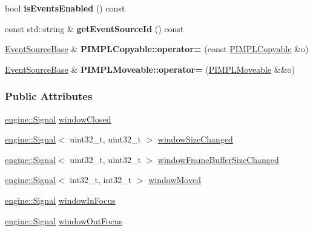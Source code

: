 \begin{DoxyCompactItemize}
\item 
bool {\bfseries is\+Events\+Enabled} () const \hypertarget{a00036_a659325f18d666f132f380e4319499572}{}\label{a00036_a659325f18d666f132f380e4319499572}

\item 
const std\+::string \& {\bfseries get\+Event\+Source\+Id} () const \hypertarget{a00036_ad41deeb2b9de38797b10777e5d1ecf13}{}\label{a00036_ad41deeb2b9de38797b10777e5d1ecf13}

\item 
\hyperlink{a00036}{Event\+Source\+Base} \& {\bfseries P\+I\+M\+P\+L\+Copyable\+::operator=} (const \hyperlink{a00060}{P\+I\+M\+P\+L\+Copyable} \&o)\hypertarget{a00060_a26fdb9b3d449d04dc653c7ae942f452b}{}\label{a00060_a26fdb9b3d449d04dc653c7ae942f452b}

\item 
\hyperlink{a00036}{Event\+Source\+Base} \& {\bfseries P\+I\+M\+P\+L\+Moveable\+::operator=} (\hyperlink{a00061}{P\+I\+M\+P\+L\+Moveable} \&\&o)\hypertarget{a00061_ac67025e8a25edffe99fa9bf67ed8ca19}{}\label{a00061_ac67025e8a25edffe99fa9bf67ed8ca19}

\end{DoxyCompactItemize}
\subsubsection*{Public Attributes}
\begin{DoxyCompactItemize}
\item 
\hyperlink{a00065}{engine\+::\+Signal} \hyperlink{a00082_a5bb494c228eb398d6893327fcf03d2d3}{window\+Closed}
\item 
\hyperlink{a00065}{engine\+::\+Signal}$<$ uint32\+\_\+t, uint32\+\_\+t $>$ \hyperlink{a00082_a20978a09b8843aa8960dc9d3a989b11a}{window\+Size\+Changed}
\item 
\hyperlink{a00065}{engine\+::\+Signal}$<$ uint32\+\_\+t, uint32\+\_\+t $>$ \hyperlink{a00082_a0c6ef7abcac1063c91a84123c81f9347}{window\+Frame\+Buffer\+Size\+Changed}
\item 
\hyperlink{a00065}{engine\+::\+Signal}$<$ int32\+\_\+t, int32\+\_\+t $>$ \hyperlink{a00082_a4bdb42d789ed9587ff8f840065752506}{window\+Moved}
\item 
\hyperlink{a00065}{engine\+::\+Signal} \hyperlink{a00082_a2a81dc83b5e8433eb39e1ca8263d0c0f}{window\+In\+Focus}
\item 
\hyperlink{a00065}{engine\+::\+Signal} \hyperlink{a00082_af6f8cc0d616685683d5c6b52b4cc07d0}{window\+Out\+Focus}
\end{DoxyCompactItemize}
